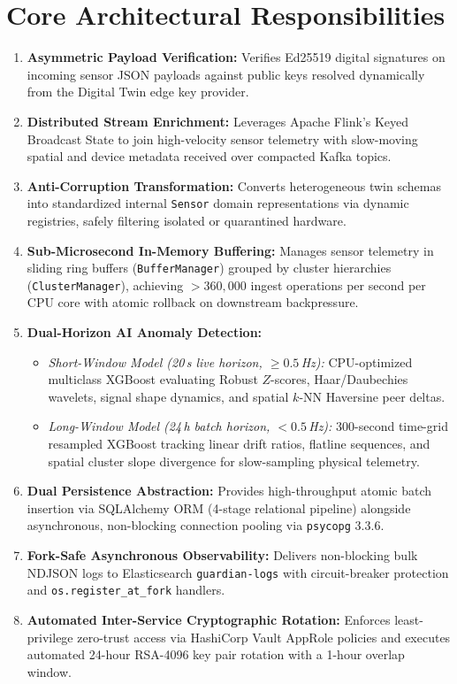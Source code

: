 \documentclass[10pt,a4paper]{report}
\begin{document}
\section{Core Architectural Responsibilities}
\begin{enumerate}[leftmargin=*]
  \item \textbf{Asymmetric Payload Verification:} Verifies Ed25519 digital signatures on incoming sensor JSON payloads against public keys resolved dynamically from the Digital Twin edge key provider.
  \item \textbf{Distributed Stream Enrichment:} Leverages Apache Flink's Keyed Broadcast State to join high-velocity sensor telemetry with slow-moving spatial and device metadata received over compacted Kafka topics.
  \item \textbf{Anti-Corruption Transformation:} Converts heterogeneous twin schemas into standardized internal \texttt{Sensor} domain representations via dynamic registries, safely filtering isolated or quarantined hardware.
  \item \textbf{Sub-Microsecond In-Memory Buffering:} Manages sensor telemetry in sliding ring buffers (\texttt{BufferManager}) grouped by cluster hierarchies (\texttt{ClusterManager}), achieving $>360,000$ ingest operations per second per CPU core with atomic rollback on downstream backpressure.
  \item \textbf{Dual-Horizon AI Anomaly Detection:}
  \begin{itemize}
    \item \textit{Short-Window Model (20\,s live horizon, $\ge 0.5$\,Hz):} CPU-optimized multiclass XGBoost evaluating Robust $Z$-scores, Haar/Daubechies wavelets, signal shape dynamics, and spatial $k$-NN Haversine peer deltas.
    \item \textit{Long-Window Model (24\,h batch horizon, $< 0.5$\,Hz):} 300-second time-grid resampled XGBoost tracking linear drift ratios, flatline sequences, and spatial cluster slope divergence for slow-sampling physical telemetry.
  \end{itemize}
  \item \textbf{Dual Persistence Abstraction:} Provides high-throughput atomic batch insertion via SQLAlchemy ORM (4-stage relational pipeline) alongside asynchronous, non-blocking connection pooling via \texttt{psycopg} 3.3.6.
  \item \textbf{Fork-Safe Asynchronous Observability:} Delivers non-blocking bulk NDJSON logs to Elasticsearch \texttt{guardian-logs} with circuit-breaker protection and \texttt{os.register\_at\_fork} handlers.
  \item \textbf{Automated Inter-Service Cryptographic Rotation:} Enforces least-privilege zero-trust access via HashiCorp Vault AppRole policies and executes automated 24-hour RSA-4096 key pair rotation with a 1-hour overlap window.
\end{enumerate}
\end{document}
